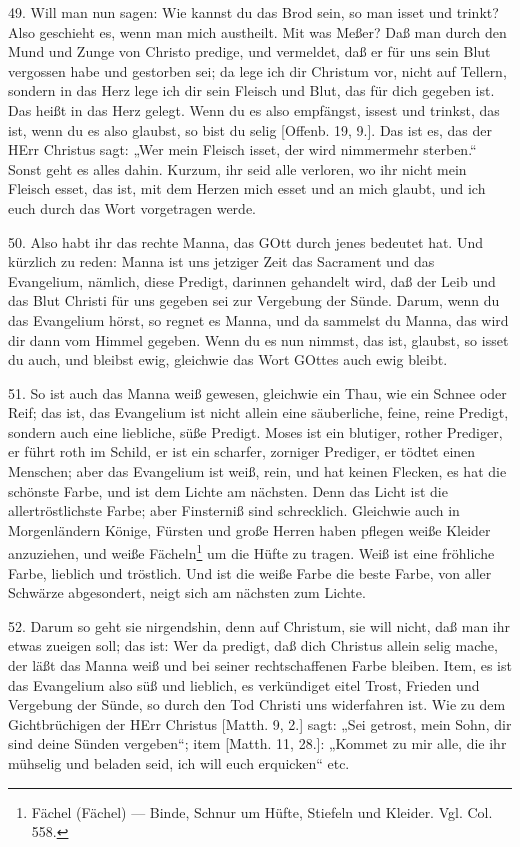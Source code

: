 49. Will man nun sagen: Wie kannst du das Brod sein, so man isset und trinkt? Also geschieht es, wenn man mich austheilt. Mit was Meßer? Daß man durch den Mund und Zunge von Christo predige, und vermeldet, daß er für uns sein Blut vergossen habe und gestorben sei; da lege ich dir Christum vor, nicht auf Tellern, sondern in das Herz lege ich dir sein Fleisch und Blut, das für dich gegeben ist. Das heißt in das Herz gelegt. Wenn du es also empfängst, issest und trinkst, das ist, wenn du es also glaubst, so bist du selig [Offenb. 19, 9.]. Das ist es, das der HErr Christus sagt: „Wer mein Fleisch isset, der wird nimmermehr sterben.“ Sonst geht es alles dahin. Kurzum, ihr seid alle verloren, wo ihr nicht mein Fleisch esset, das ist, mit dem Herzen mich esset und an mich glaubt, und ich euch durch das Wort vorgetragen werde.

50. Also habt ihr das rechte Manna, das GOtt durch jenes bedeutet hat. Und kürzlich zu reden: Manna ist uns jetziger Zeit das Sacrament und das Evangelium, nämlich, diese Predigt, darinnen gehandelt wird, daß der Leib und das Blut Christi für uns gegeben sei zur Vergebung der Sünde. Darum, wenn du das Evangelium hörst, so regnet es Manna, und da sammelst du Manna, das wird dir dann vom Himmel gegeben. Wenn du es nun nimmst, das ist, glaubst, so isset du auch, und bleibst ewig, gleichwie das Wort GOttes auch ewig bleibt.

51. So ist auch das Manna weiß gewesen, gleichwie ein Thau, wie ein Schnee oder Reif; das ist, das Evangelium ist nicht allein eine säuberliche, feine, reine Predigt, sondern auch eine liebliche, süße Predigt. Moses ist ein blutiger, rother Prediger, er führt roth im Schild, er ist ein scharfer, zorniger Prediger, er tödtet einen Menschen; aber das Evangelium ist weiß, rein, und hat keinen Flecken, es hat die schönste Farbe, und ist dem Lichte am nächsten. Denn das Licht ist die allertröstlichste Farbe; aber Finsterniß sind schrecklich. Gleichwie auch in Morgenländern Könige, Fürsten und große Herren haben pflegen weiße Kleider anzuziehen, und weiße Fächeln\footnote{Fächel (Fächel) — Binde, Schnur um Hüfte, Stiefeln und Kleider. Vgl. Col. 558.} um die Hüfte zu tragen. Weiß ist eine fröhliche Farbe, lieblich und tröstlich. Und ist die weiße Farbe die beste Farbe, von aller Schwärze abgesondert, neigt sich am nächsten zum Lichte.

52. Darum so geht sie nirgendshin, denn auf Christum, sie will nicht, daß man ihr etwas zueigen soll; das ist: Wer da predigt, daß dich
Christus allein selig mache, der läßt das Manna weiß und bei seiner rechtschaffenen Farbe bleiben. Item, es ist das Evangelium also süß und lieblich, es verkündiget eitel Trost, Frieden und Vergebung der Sünde, so durch den Tod Christi uns widerfahren ist. Wie zu dem Gichtbrüchigen der HErr Christus [Matth. 9, 2.] sagt: „Sei getrost, mein Sohn, dir sind deine Sünden vergeben“; item [Matth. 11, 28.]: „Kommet zu mir alle, die ihr mühselig und beladen seid, ich will euch erquicken“ etc.

